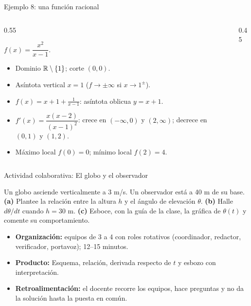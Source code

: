 \documentclass[10pt,aspectratio=169]{beamer}
\begin{document}
\begin{frame}{Ejemplo 8: una función racional}
  \begin{columns}
    \begin{column}{0.55\textwidth}
      \begin{ejemplo}
        $f(x)=\dfrac{x^2}{x-1}$.
        \begin{itemize}
          \item Dominio $\mathbb{R}\setminus\{1\}$; corte $(0,0)$.
          \item Asíntota vertical $x=1$ ($f\to\pm\infty$ si $x\to1^\pm$).
          \item $f(x)=x+1+\frac1{x-1}$: asíntota oblicua $y=x+1$.
          \item $f'(x)=\dfrac{x(x-2)}{(x-1)^2}$: crece en $(-\infty,0)$ y $(2,\infty)$; decrece en $(0,1)$ y $(1,2)$.
          \item Máximo local $f(0)=0$; mínimo local $f(2)=4$.
        \end{itemize}
      \end{ejemplo}
    \end{column}
    \begin{column}{0.45\textwidth}
      \centering
    \end{column}
  \end{columns}
\end{frame}

\begin{frame}{Actividad colaborativa: El globo y el observador}
  \small
  \begin{activa}
    Un globo asciende verticalmente a 3 m/s. Un observador está a 40 m de su base. \textbf{(a)} Plantee la relación entre la altura $h$ y el ángulo de elevación $\theta$. \textbf{(b)} Halle $d\theta/dt$ cuando $h=30$ m. \textbf{(c)} Esboce, con la guía de la clase, la gráfica de $\theta(t)$ y comente su comportamiento.
  \end{activa}
  \begin{itemize}
    \item \textbf{Organización:} equipos de 3 a 4 con roles rotativos (coordinador, redactor, verificador, portavoz); 12--15 minutos.
    \item \textbf{Producto:} Esquema, relación, derivada respecto de $t$ y esbozo con interpretación.
    \item \textbf{Retroalimentación:} el docente recorre los equipos, hace preguntas y no da la solución hasta la puesta en común.
  \end{itemize}
\end{frame}
\end{document}
